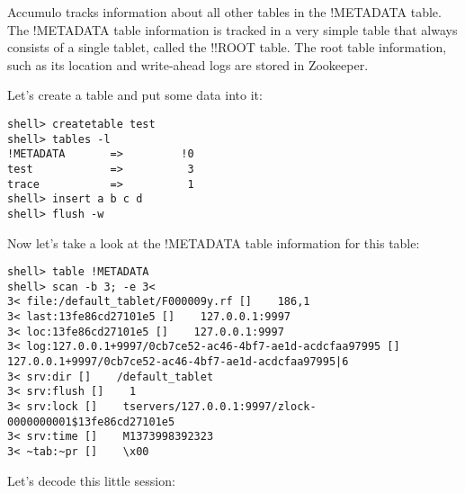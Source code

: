 Accumulo tracks information about all other tables in the !METADATA
table.  The !METADATA table information is tracked in a very simple
table that always consists of a single tablet, called the !!ROOT table.
The root table information, such as its location and write-ahead logs
are stored in Zookeeper.

Let's create a table and put some data into it:

\small
\begin{verbatim}
shell> createtable test
shell> tables -l
!METADATA       =>         !0
test            =>          3
trace           =>          1
shell> insert a b c d
shell> flush -w
\end{verbatim}
\normalsize

Now let's take a look at the !METADATA table information for this table:

\small
\begin{verbatim}
shell> table !METADATA
shell> scan -b 3; -e 3<
3< file:/default_tablet/F000009y.rf []    186,1
3< last:13fe86cd27101e5 []    127.0.0.1:9997
3< loc:13fe86cd27101e5 []    127.0.0.1:9997
3< log:127.0.0.1+9997/0cb7ce52-ac46-4bf7-ae1d-acdcfaa97995 []    127.0.0.1+9997/0cb7ce52-ac46-4bf7-ae1d-acdcfaa97995|6
3< srv:dir []    /default_tablet
3< srv:flush []    1
3< srv:lock []    tservers/127.0.0.1:9997/zlock-0000000001$13fe86cd27101e5
3< srv:time []    M1373998392323
3< ~tab:~pr []    \x00
\end{verbatim}
\normalsize

Let's decode this little session:

